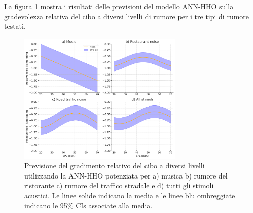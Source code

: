 \newpage
La figura \ref{fig:prediction_food} mostra i risultati delle previsioni del modello ANN-HHO sulla gradevolezza relativa del cibo a diversi livelli di rumore per i tre tipi di rumore testati.

\begin{figure}[H]
      \centering
      \includegraphics[width=0.7\textwidth]{Chapters/Figures/prediction_food.png}
      \caption{\small Previsione del gradimento relativo del cibo a diversi livelli utilizzando la ANN-HHO potenziata per a) musica b) rumore del ristorante c) rumore del traffico stradale e d) tutti gli stimoli acustici. Le linee solide indicano la media e le linee blu ombreggiate indicano le 95{\%} CIs associate alla media.}
      \label{fig:prediction_food}
\end{figure}

